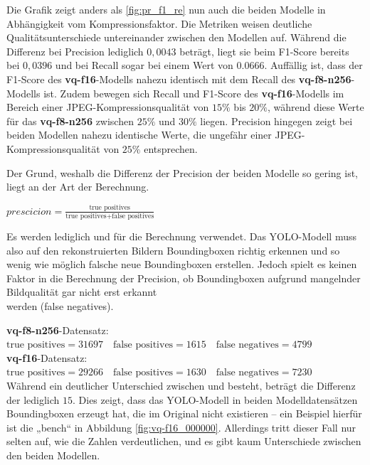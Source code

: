             Die Grafik zeigt anders als \ref{fig:pr_f1_re} nun auch die beiden Modelle in Abhängigkeit vom Kompressionsfaktor. Die Metriken weisen deutliche Qualitätsunterschiede untereinander zwischen den Modellen auf. Während die Differenz bei Precision lediglich $0,0043$ beträgt, liegt sie beim F1-Score bereits bei $0,0396$ und bei Recall sogar bei einem Wert von $0.0666$.
            Auffällig ist, dass der F1-Score des \textbf{vq-f16}-Modells nahezu identisch mit dem Recall des \textbf{vq-f8-n256}-Modells ist.
            Zudem bewegen sich Recall und F1-Score des \textbf{vq-f16}-Modells im Bereich einer JPEG-Kompressionsqualität von $15\%$ bis $20\%$, während diese Werte für das \textbf{vq-f8-n256} zwischen
            $25\%$ und $30\%$ liegen. Precision hingegen zeigt bei beiden Modellen nahezu identische Werte, die ungefähr einer JPEG-Kompressionsqualität von $25\%$ entsprechen.
            
\newpage        
            Der Grund, weshalb die Differenz der Precision der beiden Modelle so gering ist, liegt an der Art der Berechnung.
            \begin{center}  
                \large$prescicion = \frac{\text{true positives}}{\text{true positives} + \text{false positives}}$\\
            \end{center}
            Es werden lediglich  und  für die Berechnung verwendet.
            Das YOLO-Modell muss also auf den rekonstruierten Bildern Boundingboxen richtig erkennen und so wenig wie möglich falsche neue Boundingboxen erstellen. Jedoch spielt es keinen Faktor in die Berechnung der Precision, ob Boundingboxen aufgrund mangelnder Bildqualität gar nicht erst erkannt\\
            werden (false negatives).\vspace{2mm}
            
            \noindent\textbf{vq-f8-n256}-Datensatz:\\
            $\text{true positives} = 31697 \quad \text{false positives} = 1615 \quad \text{false negatives} = 4799$\\
            \textbf{vq-f16}-Datensatz:\\
            $\text{true positives} = 29266 \quad \text{false positives} = 1630 \quad \text{false negatives} = 7230$\\

            Während ein deutlicher Unterschied zwischen  und  besteht, beträgt die Differenz der  lediglich $15$. Dies zeigt, dass das YOLO-Modell in beiden Modelldatensätzen Boundingboxen erzeugt hat, die im Original nicht existieren – ein Beispiel hierfür ist die „bench“ in Abbildung \ref{fig:vq-f16_000000}. Allerdings tritt dieser Fall nur selten auf, wie die Zahlen verdeutlichen, und es gibt kaum Unterschiede zwischen den beiden Modellen.


